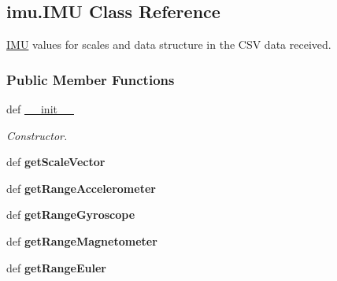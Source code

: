 \hypertarget{classimu_1_1_i_m_u}{\subsection{imu.\-I\-M\-U Class Reference}
\label{classimu_1_1_i_m_u}
}


\hyperlink{classimu_1_1_i_m_u}{I\-M\-U} values for scales and data structure in the C\-S\-V data received.  


\subsubsection*{Public Member Functions}
\begin{DoxyCompactItemize}
\item 
def \hyperlink{classimu_1_1_i_m_u_a59e33a38d9043a4db299417f0042cf89}{\-\_\-\-\_\-init\-\_\-\-\_\-}
\begin{DoxyCompactList}\small\item\em Constructor. \end{DoxyCompactList}\item 
\hypertarget{classimu_1_1_i_m_u_aab7bfabaa5beb47d4868f72a431e31aa}{def {\bfseries get\-Scale\-Vector}}\label{classimu_1_1_i_m_u_aab7bfabaa5beb47d4868f72a431e31aa}

\item 
\hypertarget{classimu_1_1_i_m_u_ad9dae316b5fe3e6fd1c5370c86426b9c}{def {\bfseries get\-Range\-Accelerometer}}\label{classimu_1_1_i_m_u_ad9dae316b5fe3e6fd1c5370c86426b9c}

\item 
\hypertarget{classimu_1_1_i_m_u_a67e0f3567b12280d300f2d2f68a0ce99}{def {\bfseries get\-Range\-Gyroscope}}\label{classimu_1_1_i_m_u_a67e0f3567b12280d300f2d2f68a0ce99}

\item 
\hypertarget{classimu_1_1_i_m_u_ac5c8b889f5a3c4a0210b3b6f83f963e9}{def {\bfseries get\-Range\-Magnetometer}}\label{classimu_1_1_i_m_u_ac5c8b889f5a3c4a0210b3b6f83f963e9}

\item 
\hypertarget{classimu_1_1_i_m_u_adab7ee8a62d6636ff4d112df2ebe1b1b}{def {\bfseries get\-Range\-Euler}}\label{classimu_1_1_i_m_u_adab7ee8a62d6636ff4d112df2ebe1b1b}

\end{DoxyCompactItemize}
